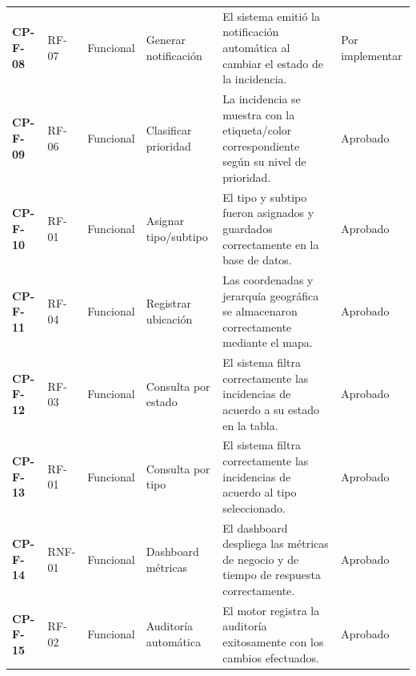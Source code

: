 \begin{xltabular}{\textwidth}{X X X X X X}
        \textbf{CP-F-08} & RF-07 & Funcional & Generar notificación & El sistema emitió la notificación automática al cambiar el estado de la incidencia. & Por implementar \\
        \textbf{CP-F-09} & RF-06 & Funcional & Clasificar prioridad & La incidencia se muestra con la etiqueta/color correspondiente según su nivel de prioridad. & Aprobado \\
        \textbf{CP-F-10} & RF-01 & Funcional & Asignar tipo/subtipo & El tipo y subtipo fueron asignados y guardados correctamente en la base de datos. & Aprobado \\
        \textbf{CP-F-11} & RF-04 & Funcional & Registrar ubicación & Las coordenadas y jerarquía geográfica se almacenaron correctamente mediante el mapa. & Aprobado \\
        \textbf{CP-F-12} & RF-03 & Funcional & Consulta por estado & El sistema filtra correctamente las incidencias de acuerdo a su estado en la tabla. & Aprobado \\
        \textbf{CP-F-13} & RF-01 & Funcional & Consulta por tipo & El sistema filtra correctamente las incidencias de acuerdo al tipo seleccionado. & Aprobado \\
        \textbf{CP-F-14} & RNF-01 & Funcional & Dashboard métricas & El dashboard despliega las métricas de negocio y de tiempo de respuesta correctamente. & Aprobado \\
        \textbf{CP-F-15} & RF-02 & Funcional & Auditoría automática & El motor registra la auditoría exitosamente con los cambios efectuados. & Aprobado \\
        \bottomrule
\end{xltabular}

